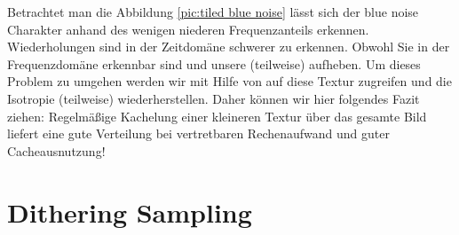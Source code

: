 Betrachtet man die Abbildung \ref{pic:tiled blue noise} lässt sich der blue noise Charakter anhand des
wenigen niederen Frequenzanteils erkennen. Wiederholungen sind in der Zeitdomäne schwerer zu erkennen. 
Obwohl Sie in der Frequenzdomäne erkennbar sind und unsere 
(teilweise) aufheben. Um dieses Problem zu umgehen werden wir mit Hilfe von 
auf diese Textur zugreifen und die Isotropie (teilweise) wiederherstellen.
Daher können wir hier folgendes Fazit ziehen: Regelmäßige Kachelung einer kleineren  Textur 
über das gesamte Bild liefert eine gute  Verteilung bei vertretbaren Rechenaufwand und guter 
Cacheausnutzung!

\section{Dithering Sampling}
\label{ch:Content1:sec:blue noise sampling}

